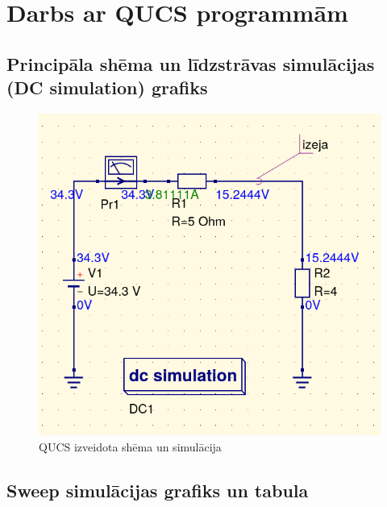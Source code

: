 \documentclass{report}
\begin{document}
\section{Darbs ar QUCS programmām}

\subsection{Principāla shēma un līdzstrāvas simulācijas (DC simulation) grafiks}

\begin{figure}[!tb]
\includegraphics[width=15cm]{shema.png}
\caption{QUCS izveidota shēma un simulācija}
\label{i:example}
\end{figure}


\subsection{Sweep simulācijas grafiks un tabula}
\end{document}

